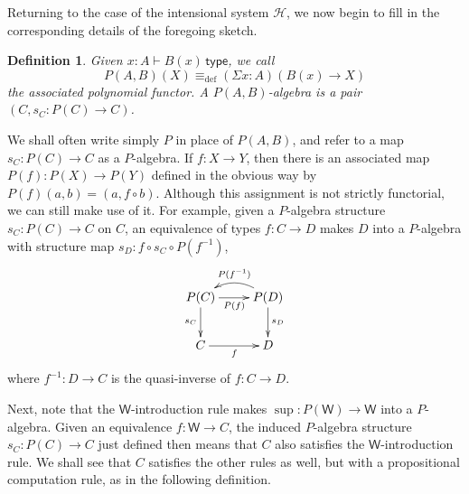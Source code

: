 \documentclass[reqno,10pt,a4paper,oneside]{amsart}
\numberwithin{equation}{section}
\theoremstyle{mythm}
\theoremstyle{mydef}
\newtheorem{definition}[theorem]{Definition}
\theoremstyle{myrmk}
\newtheorem{remark}[theorem]{Remark}
\newcommand{\deq}{\equiv}
\newcommand{\defeq}{\deq_{\mathrm{def}}}
\newcommand{\Hint}{\mathcal{H}}
\newcommand{\type}{\mathsf{type}}
\newcommand{\W}{\mathsf{W}}
\newcommand{\Bool}{\mathsf{Bool}}
\begin{document}

Returning to the case of the intensional system $\Hint$, we now begin to fill in the corresponding details of the foregoing sketch.

\begin{definition}
Given $x:A \vdash B(x)\, \type$, we call $$P(A,B)(X) \defeq (\Sigma x:A) (B(x)\to X)$$ the associated \emph{polynomial functor}.  A \emph{$P(A,B)$-algebra} is a pair $(C, s_C: P(C) \to C)$.    
\end{definition}

We shall often write simply $P$ in place of $P(A,B)$, and refer to a map $s_C : P(C)\to C$ as a $P$-algebra.  
If $f : X\to Y$, then there is an associated map $P(f) : P(X)\to P(Y)$ defined in the obvious way by $P(f)(a, b) = (a,f\circ b)
$.  Although this assignment is not strictly functorial, we can still make use of it. For example, given a $P$-algebra structure $s_C :P(C)\to C$ on $C$, an equivalence of types $f : C \to D$ makes $D$ into a $P$-algebra with structure map $s_D : f\circ s_C\circ P(f^{-1})$,
  \[
\xymatrix{
P(C) \ar[d]_{s_C} \ar[r]_{P(f)} & \ar@/_1pc/[l]_{P(f^{-1})} P(D)  \ar[d]^{s_D}  \\
 C  \ar[r]_{f} & D
 }
 \]
 where $f^{-1} : D\to C$ is the quasi-inverse of $f : C\to D$.


 
Next, note that the $\W$-introduction rule makes $\sup : P(\W)\to \W$ into a $P$-algebra.  Given an equivalence  $f : \W \to C$, the induced $P$-algebra structure $s_C:P(C)\to C$ just defined then means that $C$ also satisfies the $\W$-introduction rule.  We shall see that $C$ satisfies the other rules as well, but with a propositional computation rule, as in the following definition.
\end{document}
